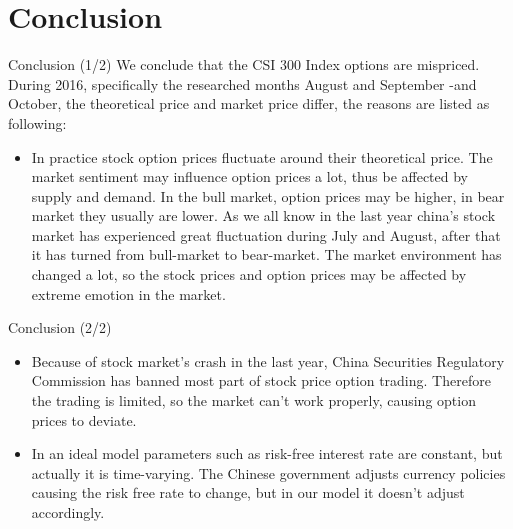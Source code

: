 \documentclass[unknownkeysallowed]{beamer}
\begin{document}
\section{Conclusion}
\begin{frame}{Conclusion (1/2)}
We conclude that the CSI 300 Index options are mispriced. During 2016, specifically the researched months August and September -and October, the theoretical price and market price differ, the reasons are listed as following:
\linebreak

 \begin{itemize}
    \item{In practice stock option prices fluctuate around their theoretical price. The market sentiment may influence option prices a lot, thus be affected by  supply and demand. In the bull market, option prices may be higher, in bear market they usually are lower. As we all know in the last year china’s stock market has experienced great fluctuation during July and August, after that  it has turned from bull-market to bear-market. The market environment has changed a lot, so the stock prices and option prices may be affected by extreme emotion in the market.}
     \end{itemize}
\end{frame}

\begin{frame}{Conclusion (2/2)}
 \begin{itemize}
 \item{Because of stock market’s crash in the last year, China Securities Regulatory Commission has banned most part of stock price option trading. Therefore the trading is limited, so the market can’t work properly, causing option prices to deviate.}
 \linebreak
    \item{In an ideal model parameters such as risk-free interest rate are constant, but actually it is time-varying. The Chinese government adjusts currency policies causing the risk free rate to change, but in our model it doesn’t adjust accordingly.}
    \end{itemize}
    \end{frame}
\end{document}
